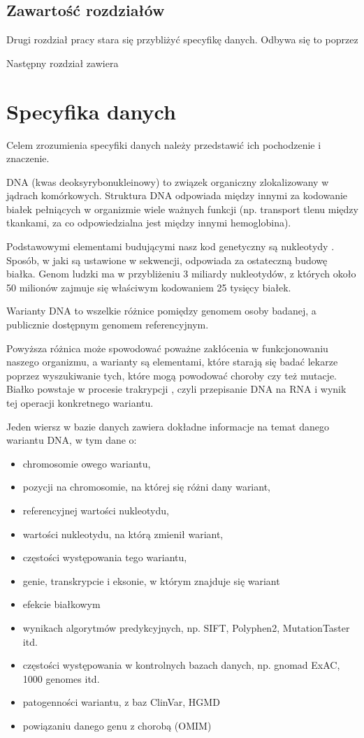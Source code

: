 \documentclass[a4paper,12pt,twoside]{article}
\begin{document}
\subsection{Zawartość rozdziałów} 
Drugi rozdział pracy stara się przybliżyć specyfikę danych. 
Odbywa się to poprzez 

Następny rozdział zawiera 

\newpage
\section{Specyfika danych}  
Celem zrozumienia specyfiki danych należy przedstawić ich pochodzenie
i znaczenie.

DNA (kwas deoksyrybonukleinowy) \cite{dna} to związek organiczny zlokalizowany w jądrach komórkowych.
Struktura DNA odpowiada między innymi za kodowanie białek \cite{geneticCode} pełniących w organizmie wiele ważnych funkcji (np. transport tlenu między tkankami, za co
odpowiedzialna jest między innymi hemoglobina).

Podstawowymi elementami budującymi nasz kod genetyczny są
nukleotydy \cite{nukleotydy}. Sposób, w jaki są ustawione w sekwencji, odpowiada
za ostateczną budowę białka. Genom ludzki ma w przybliżeniu 3 miliardy
nukleotydów, z których około 50 milionów zajmuje się właściwym kodowaniem
25 tysięcy białek.

Warianty DNA to wszelkie różnice pomiędzy genomem osoby badanej,
a publicznie dostępnym genomem referencyjnym.

Powyższa różnica może spowodować poważne
zakłócenia w funkcjonowaniu naszego organizmu, a warianty
są elementami, które starają się badać
lekarze poprzez wyszukiwanie tych, które mogą powodować choroby
czy też mutacje.
Białko powstaje w procesie trakrypcji \cite{transkrypcja}, czyli przepisanie DNA na RNA
i wynik tej operacji konkretnego wariantu.

Jeden wiersz w bazie danych zawiera dokładne informacje na temat danego wariantu DNA, w tym dane o:

\begin{itemize}
\item chromosomie owego wariantu,
\item pozycji na chromosomie, na której się różni dany wariant,
\item referencyjnej wartości nukleotydu,
\item wartości nukleotydu, na którą zmienił wariant,
\item częstości występowania tego wariantu,
\item genie, transkrypcie i eksonie, w którym znajduje się wariant
\item efekcie białkowym
\item wynikach algorytmów predykcyjnych, np. SIFT, Polyphen2, MutationTaster itd.
\item częstości występowania w kontrolnych bazach danych, np. gnomad ExAC, 1000 genomes itd.
\item patogenności wariantu, z baz ClinVar, HGMD
\item powiązaniu danego genu z chorobą (OMIM)

\end{itemize}
\end{document}
